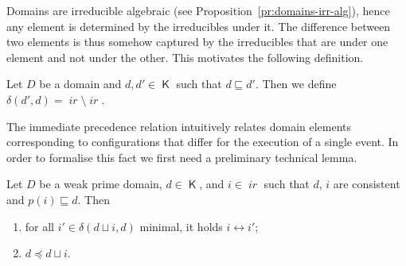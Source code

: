 \documentclass[conference]{IEEEtran}
\newcommand{\compact}[1]{\ensuremath{\mathop{\mathsf{K}({#1})}}}
\newcommand{\principal}[1]{\ensuremath{\mathop{\downarrow\!{#1}}}}
\newcommand{\ir}[1]{\ensuremath{\mathop{\mathit{ir}({#1})}}}
\newcommand{\diff}[2]{\ensuremath{\delta({#1},{#2})}}
\newcommand{\pred}[1]{\ensuremath{\mathit{p}({#1})}}
\begin{document}

Domains are irreducible algebraic
(see Proposition~\ref{pr:domains-irr-alg}), hence any element is
determined by the irreducibles under it. The difference between two
elements is thus somehow captured by the irreducibles that are under
one element and not under the other.
%
This motivates the following definition.

\begin{definition}
  Let $D$ be a domain and $d, d' \in \compact{D}$ such that
  $d \sqsubseteq d'$. Then we define
  $\diff{d'}{d} = \ir{d'} \setminus \ir{d}$.
\end{definition}

The immediate precedence relation intuitively relates domain elements
corresponding to configurations that differ for the
execution of a single event.
%
In order to formalise this fact we first need a preliminary technical lemma.

\begin{lemma}
  \label{le:prec-irr-a}
  Let $D$ be a weak prime domain, $d \in \compact{D}$, and $i \in \ir{D}$
  such that $d$, $i$ are consistent and $\pred{i} \sqsubseteq d$. Then
  \begin{enumerate}
  \item 
    \label{le:prec-irr-a:1}
    for all $i' \in \diff{d \sqcup i}{d}$ minimal, it holds
    $i \leftrightarrow i'$;
  \item 
    \label{le:prec-irr-a:2}
    $d \preceq d \sqcup i$.
  \end{enumerate}
\end{lemma}
\end{document}

